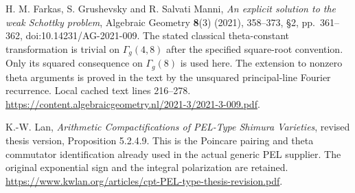 H. M. Farkas, S. Grushevsky and R. Salvati Manni,
\emph{An explicit solution to the weak Schottky problem},
Algebraic Geometry \textbf{8}(3) (2021), 358--373,
\S2, pp.\ 361--362, doi:10.14231/AG-2021-009.
The stated classical theta-constant transformation is trivial
on $\Gamma_g(4,8)$ after the specified square-root convention.
Only its squared consequence on $\Gamma_g(8)$ is used here.
The extension to nonzero theta arguments is proved in the text
by the unsquared principal-line Fourier recurrence.
Local cached text lines 216--278.
\url{https://content.algebraicgeometry.nl/2021-3/2021-3-009.pdf}.

K.-W. Lan, \emph{Arithmetic Compactifications of PEL-Type
Shimura Varieties}, revised thesis version,
Proposition 5.2.4.9.
This is the Poincare pairing and theta commutator identification
already used in the actual generic PEL supplier.  The original
exponential sign and the integral polarization are retained.
\url{https://www.kwlan.org/articles/cpt-PEL-type-thesis-revision.pdf}.
